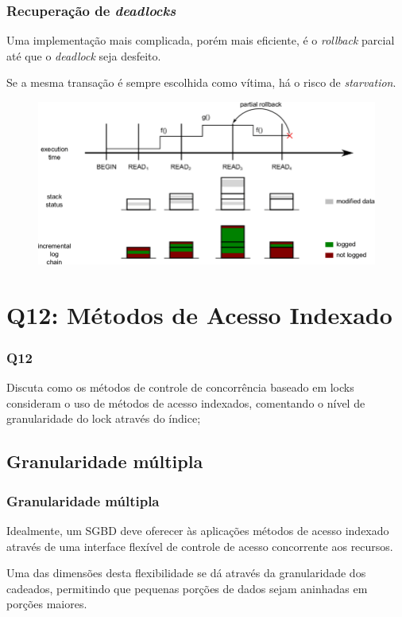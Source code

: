 \documentclass{beamer}
\begin{document}
\begin{frame} %
    \frametitle{Recuperação de \emph{deadlocks}}
    Uma implementação mais complicada, porém mais eficiente, é o \emph{rollback} parcial até que o \emph{deadlock} seja desfeito.

    \medskip
    Se a mesma transação é sempre escolhida como vítima, há o risco de \emph{starvation}.

    \medskip
    \begin{figure}
        \includegraphics[width=0.8\linewidth]{partialrollback.png}
    \end{figure}

\end{frame}

\section{Q12: Métodos de Acesso Indexado}


\begin{frame}
    \frametitle{Q12}

    Discuta como os métodos de controle de concorrência baseado em locks
    consideram o uso de métodos de acesso indexados,
    comentando o nível de granularidade do lock através do índice;

\end{frame}

\subsection{Granularidade múltipla}

\begin{frame} %
    \frametitle{Granularidade múltipla}
    
    Idealmente, um SGBD deve oferecer às aplicações métodos de acesso indexado através de uma interface flexível de controle de acesso concorrente aos recursos.
    
    \medskip
    Uma das dimensões desta flexibilidade se dá através da granularidade dos cadeados, permitindo que pequenas porções de dados sejam aninhadas em porções maiores.
\end{frame}
\end{document}
